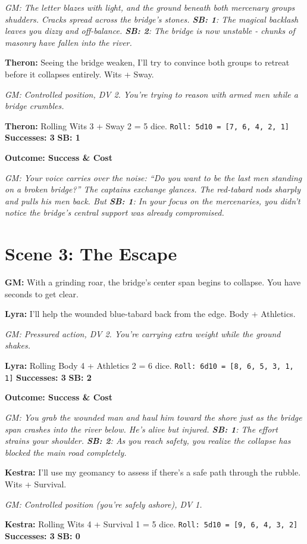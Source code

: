 \documentclass[11pt]{article}
\newcommand{\player}[1]{\textbf{#1:}}
\newcommand{\gm}[1]{\textit{GM: #1}}
\newcommand{\roll}[2]{\texttt{Roll: #1d10 = [#2]}}
\newcommand{\success}[1]{\textbf{Successes: #1}}
\newcommand{\cp}[1]{\textbf{SB: #1}}
\newcommand{\outcome}[1]{\textbf{Outcome: #1}}
\begin{document}
\gm{The letter blazes with light, and the ground beneath both mercenary groups shudders. Cracks spread across the bridge's stones. \cp{1}: The magical backlash leaves you dizzy and off-balance. \cp{2}: The bridge is now unstable - chunks of masonry have fallen into the river.}

\player{Theron} Seeing the bridge weaken, I'll try to convince both groups to retreat before it collapses entirely. Wits + Sway.

\gm{Controlled position, DV 2. You're trying to reason with armed men while a bridge crumbles.}

\player{Theron} Rolling Wits 3 + Sway 2 = 5 dice. \roll{5}{7, 6, 4, 2, 1} \success{3} \cp{1}

\outcome{Success \& Cost}

\gm{Your voice carries over the noise: ``Do you want to be the last men standing on a broken bridge?'' The captains exchange glances. The red-tabard nods sharply and pulls his men back. But \cp{1}: In your focus on the mercenaries, you didn't notice the bridge's central support was already compromised.}

\section*{Scene 3: The Escape}

\player{GM} With a grinding roar, the bridge's center span begins to collapse. You have seconds to get clear.

\player{Lyra} I'll help the wounded blue-tabard back from the edge. Body + Athletics.

\gm{Pressured action, DV 2. You're carrying extra weight while the ground shakes.}

\player{Lyra} Rolling Body 4 + Athletics 2 = 6 dice. \roll{6}{8, 6, 5, 3, 1, 1} \success{3} \cp{2}

\outcome{Success \& Cost}

\gm{You grab the wounded man and haul him toward the shore just as the bridge span crashes into the river below. He's alive but injured. \cp{1}: The effort strains your shoulder. \cp{2}: As you reach safety, you realize the collapse has blocked the main road completely.}

\player{Kestra} I'll use my geomancy to assess if there's a safe path through the rubble. Wits + Survival.

\gm{Controlled position (you're safely ashore), DV 1.}

\player{Kestra} Rolling Wits 4 + Survival 1 = 5 dice. \roll{5}{9, 6, 4, 3, 2} \success{3} \cp{0}
\end{document}
